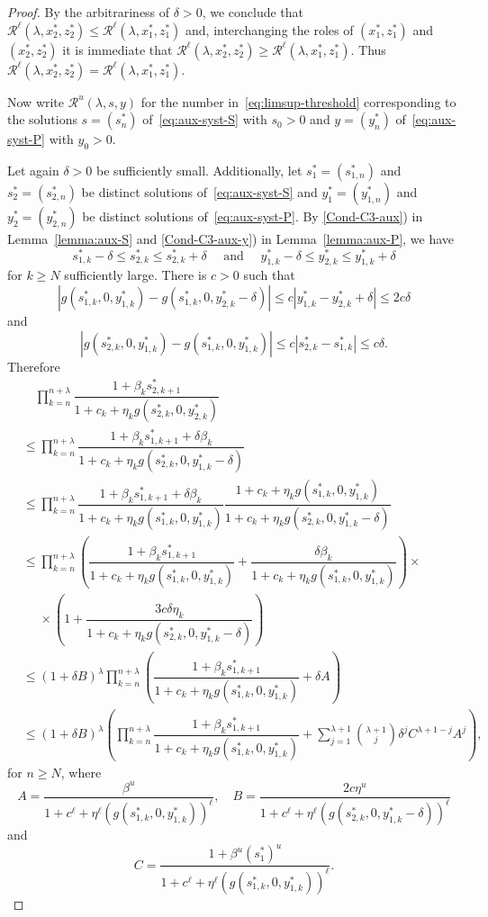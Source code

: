 \documentclass[reqno]{amsart}
\renewcommand{\le}{\leqslant}
\renewcommand{\ge}{\geqslant}
\newcommand{\lbd}{\lambda}
\newcommand{\cR}{\mathcal R}
\begin{document}
{{\begin{proof}
By the arbitrariness of $\delta>0$, we conclude that $\cR^\ell(\lambda,x^*_2,z^*_2) \le \cR^\ell(\lambda,x^*_1,z^*_1)$ and, interchanging the roles of $(x^*_1,z^*_1)$ and $(x^*_2,z^*_2)$ it is immediate that
$\cR^\ell(\lambda,x^*_2,z^*_2) \ge \cR^\ell(\lambda,x^*_1,z^*_1)$. Thus $\cR^\ell(\lambda,x^*_2,z^*_2) = \cR^\ell(\lambda,x^*_1,z^*_1)$.

Now write $\cR^u(\lambda,s,y)$ for the number in~\eqref{eq:limsup-threshold} corresponding to the solutions $s=(s_n^*)$ of~\eqref{eq:aux-syst-S} with $s_0>0$ and  $y=(y_n^*)$ of~\eqref{eq:aux-syst-P} with $y_0>0$.

Let again $\delta>0$ be sufficiently small. Additionally, let $s_1^*=(s^*_{1,n})$ and $s_2^*=(s^*_{2,n})$ be distinct solutions of~\eqref{eq:aux-syst-S} and $y_1^*=(y^*_{1,n})$ and $y_2^*=(y^*_{2,n})$ be distinct solutions of~\eqref{eq:aux-syst-P}. By \ref{Cond-C3-aux}) in Lemma~\ref{lemma:aux-S} and \ref{Cond-C3-aux-y}) in Lemma~\ref{lemma:aux-P}, we have
$$s^*_{1,k} -\delta \le s_{2,k}^* \le s_{2,k}^*+ \delta \quad \text{ and } \quad y^*_{1,k} -\delta \le y_{2,k}^* \le y_{1,k}^*+ \delta$$
for $k \ge N$ sufficiently large. There is $c>0$ such that
$$|g(s^*_{1,k},0,y^*_{1,k})-g(s^*_{1,k},0,y^*_{2,k}-\delta)|\le c |y^*_{1,k}-y^*_{2,k}+\delta| \le 2c\delta$$
and
$$|g(s^*_{2,k},0,y^*_{1,k})-g(s^*_{1,k},0,y^*_{1,k})|\le c |s^*_{2,k}-s^*_{1,k}| \le c\delta.$$
Therefore
\begin{equation}\label{eq:estim-prod-le}
\begin{split}
& \quad \prod_{k=n}^{n+\lambda} \dfrac{1+\beta_ks^*_{2,k+1}}{1+c_k+\eta_kg(s_{2,k}^*,0,y^*_{2,k})}\\
& \le \prod_{k=n}^{n+\lambda} \dfrac{1+\beta_ks^*_{1,k+1}+\delta\beta_k}{1+c_k+\eta_kg(s_{2,k}^*,0,y^*_{1,k}-\delta)}\\
& \le \prod_{k=n}^{n+\lambda} \dfrac{1+\beta_ks^*_{1,k+1}+\delta\beta_k}{1+c_k+\eta_kg(s_{1,k}^*,0,y^*_{1,k})}\dfrac{1+c_k+\eta_kg(s_{1,k}^*,0,y^*_{1,k})}{1+c_k+\eta_kg(s_{2,k}^*,0,y^*_{1,k}-\delta)}\\
& \le \prod_{k=n}^{n+\lambda} \left(\dfrac{1+\beta_ks^*_{1,k+1}}{1+c_k+\eta_kg(s_{1,k}^*,0,y^*_{1,k})}+\dfrac{\delta\beta_k}{1+c_k+\eta_kg(s_{1,k}^*,0,y^*_{1,k})}\right)\times\\
& \phantom{=} \times\left(1+\dfrac{3c\delta\eta_k}{1+c_k+\eta_kg(s_{2,k}^*,0,y^*_{1,k}-\delta)}\right)\\
& \le (1+\delta B)^\lbd \prod_{k=n}^{n+\lambda} \left(\dfrac{1+\beta_ks^*_{1,k+1}}{1+c_k+\eta_kg(s_{1,k}^*,0,y^*_{1,k})}+\delta A\right)
\\
& \le (1+\delta B)^\lbd \left(\prod_{k=n}^{n+\lambda} \dfrac{1+\beta_ks^*_{1,k+1}}{1+c_k+\eta_kg(s_{1,k}^*,0,y^*_{1,k})}
+  \sum_{j=1}^{\lambda+1} \binom{\lambda+1}{j}\delta^j  C^{\lambda+1-j} A^j\right),
\end{split}
\end{equation}
for $n \ge N$, where
$$A=\dfrac{\beta^u}{1+c^\ell+\eta^\ell (g(s_{1,k}^*,0,y^*_{1,k}))^\ell}, \quad B=\dfrac{2c\eta^u}{1+c^\ell+\eta^\ell (g(s_{2,k}^*,0,y^*_{1,k}-\delta))^\ell}$$
and
$$C=\dfrac{1+\beta^u (s^*_1)^u}{1+c^\ell+\eta^\ell (g(s_{1,k}^*,0,y^*_{1,k}))^\ell}.$$


\end{proof}}}
\end{document}
